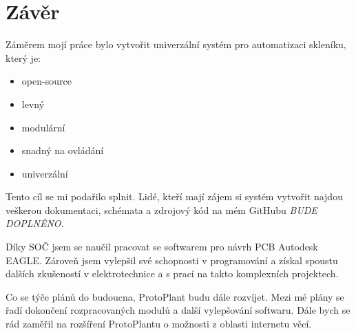 \chapter*{Závěr}

Záměrem mojí práce bylo vytvořit univerzální systém pro automatizaci skleníku, který je:
\begin{itemize}
    \item open-source
    \item levný
    \item modulární
    \item snadný na ovládání
    \item univerzální
\end{itemize}

Tento cíl se mi podařilo splnit.
Lidé, kteří mají zájem si systém vytvořit najdou veškerou dokumentaci, schémata a zdrojový kód na mém GitHubu \textit{BUDE DOPLNĚNO}.

Díky SOČ jsem se naučil pracovat se softwarem pro návrh PCB Autodesk EAGLE.
Zároveň jsem vylepšil své schopnosti v programování a získal spoustu dalších zkušeností v elektrotechnice a s prací na takto komplexních projektech.

Co se týče plánů do budoucna, ProtoPlant budu dále rozvíjet.
Mezi mé plány se řadí dokončení rozpracovaných modulů a další vylepšování softwaru.
Dále bych se rád zaměřil na rozšíření ProtoPlantu o možnosti z oblasti internetu věcí.

\newpage